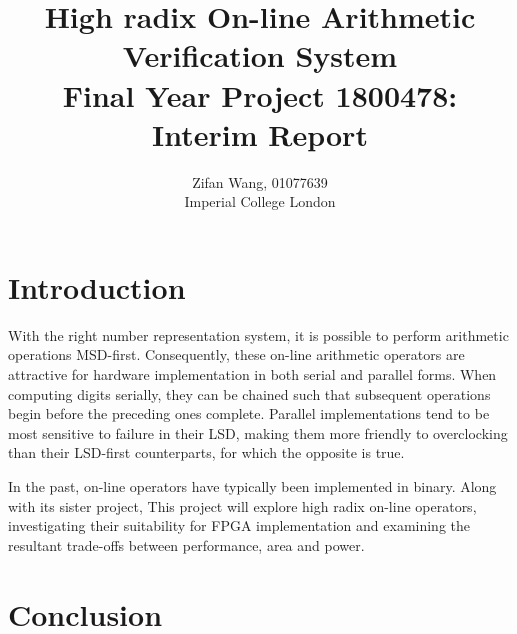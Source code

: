 \documentclass[journal]{IEEEtran}
\begin{document}
\title{%
  High radix On-line Arithmetic Verification System\\
  \large Final Year Project 1800478: Interim Report}
\author{Zifan Wang, 01077639\\Imperial College London}

\onecolumn
\maketitle
\tableofcontents

\twocolumn
\newpage

\section{Introduction}
With the right number representation system, it is possible to perform
arithmetic operations MSD-first.
Consequently, these on-line arithmetic operators are attractive
for hardware implementation in both serial and parallel forms.
When computing digits serially, they can be chained such that subsequent
operations begin before the preceding ones complete.
Parallel implementations tend to be most sensitive to failure in their LSD,
making them more friendly to overclocking than their LSD-first counterparts,
for which the opposite is true.

In the past, on-line operators have typically been implemented in binary.
Along with its sister project,
This project will explore high radix on-line operators,
investigating their suitability for FPGA implementation and examining the
resultant trade-offs between performance, area and power.








\section{Conclusion}

\newpage
\appendices




\end{document}
